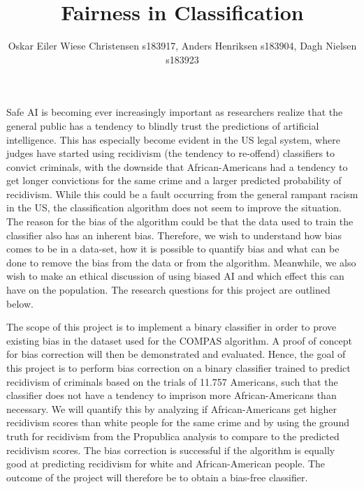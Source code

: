 \documentclass[11pt, fleqn]{article}
\title{Fairness in Classification}
\author{\small Oskar Eiler Wiese Christensen s183917, Anders Henriksen s183904, Dagh Nielsen s183923}
\date{}
\begin{document}
	\maketitle
	\vspace*{-0.65cm}	
	\noindent
	Safe AI is becoming ever increasingly important as researchers realize that the general public has a tendency to blindly trust the predictions of artificial intelligence. This has especially become evident in the US legal system, where judges have started using recidivism (the tendency to re-offend) classifiers to convict criminals, with the downside that African-Americans had a tendency to get longer convictions for the same crime and a larger predicted probability of recidivism. While this could be a fault occurring from the general rampant racism in the US, the classification algorithm does not seem to improve the situation. The reason for the bias of the algorithm could be that the data used to train the classifier also has an inherent bias. Therefore, we wish to understand how bias comes to be in a data-set, how it is possible to quantify bias and what can be done to remove the bias from the data or from the algorithm. Meanwhile, we also wish to make an ethical discussion of using biased AI and which effect this can have on the population. The research questions for this project are outlined below. 
	
	The scope of this project is to implement a binary classifier in order to prove existing bias in the dataset used for the COMPAS algorithm. A proof of concept for bias correction will then be demonstrated and evaluated. Hence, the goal of this project is to perform bias correction on a binary classifier trained to predict recidivism of criminals based on the trials of 11.757 Americans, such that the classifier does not have a tendency to imprison more African-Americans than necessary. We will quantify this by analyzing if African-Americans get higher recidivism scores than white people for the same crime and by using the ground truth for recidivism from the Propublica analysis to compare to the predicted recidivism scores. The bias correction is successful if the algorithm is equally good at predicting recidivism for white and African-American people. The outcome of the project will therefore be to obtain a bias-free classifier.
	
	\vspace*{-0.4cm}
	
	
\end{document}

